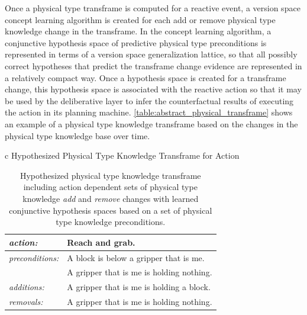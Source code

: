 Once a physical type transframe is computed for a reactive event, a
version space concept learning algorithm \cite[]{mitchell:1997} is
created for each add or remove physical type knowledge change in the
transframe.  In the concept learning algorithm, a conjunctive
hypothesis space of predictive physical type preconditions is
represented in terms of a version space generalization lattice, so
that all possibly correct hypotheses that predict the transframe
change evidence are represented in a relatively compact way.  Once a
hypothesis space is created for a transframe change, this hypothesis
space is associated with the reactive action so that it may be used by
the deliberative layer to infer the counterfactual results of
executing the action in its planning machine.
{\mbox{\autoref{table:abstract_physical_transframe}}} shows an example
of a physical type knowledge transframe based on the changes in the
physical type knowledge base over time.
\begin{table}[h]
\centering
\begin{tabular}{c}
  Hypothesized Physical Type Knowledge Transframe for Action \\
  \begin{tabular}{|l|l|}
    \hline
    \emph{action:}        & Reach and grab. \\
    \hline
    \emph{preconditions:} & A block is below a gripper that is me. \\
    ~                     & A gripper that is me is holding nothing. \\
    \hline
    \emph{additions:}     & A gripper that is me is holding a block. \\
    \hline
    \emph{removals:}      & A gripper that is me is holding nothing. \\
    \hline
  \end{tabular}
\end{tabular}
\caption[Hypothesized physical type knowledge transframe for
  action.]{Hypothesized physical type knowledge transframe including
  action dependent sets of physical type knowledge \emph{add} and
  \emph{remove} changes with learned conjunctive hypothesis spaces
  based on a set of physical type knowledge preconditions.}
\label{table:abstract_physical_transframe}
\end{table}

